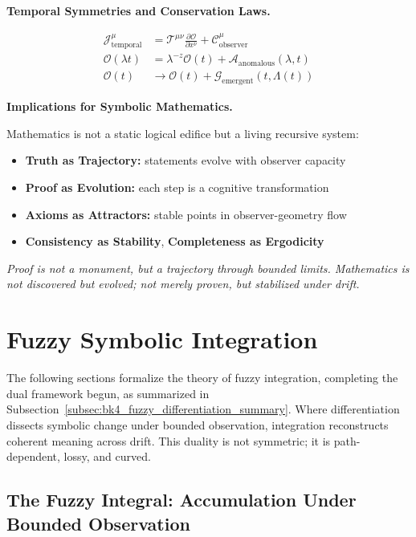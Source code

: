 \begin{scholium}
\vspace{1em}
\noindent\textbf{Temporal Symmetries and Conservation Laws.}

\begin{align*}
\mathcal{J}_{\text{temporal}}^\mu &= \mathcal{T}^{\mu\nu} \frac{\partial \mathcal{O}}{\partial x^\nu} + \mathcal{C}_{\text{observer}}^\mu \\
\mathcal{O}(\lambda t) &= \lambda^{-z} \mathcal{O}(t) + \mathcal{A}_{\text{anomalous}}(\lambda, t) \\
\mathcal{O}(t) &\rightarrow \mathcal{O}(t) + \mathcal{G}_{\text{emergent}}(t, \Lambda(t))
\end{align*}

\vspace{1em}
\noindent\textbf{Implications for Symbolic Mathematics.}

Mathematics is not a static logical edifice but a living recursive system:
\begin{itemize}
    \item \textbf{Truth as Trajectory:} statements evolve with observer capacity
    \item \textbf{Proof as Evolution:} each step is a cognitive transformation
    \item \textbf{Axioms as Attractors:} stable points in observer-geometry flow
    \item \textbf{Consistency as Stability}, \textbf{Completeness as Ergodicity}
\end{itemize}

\textit{Proof is not a monument, but a trajectory through bounded limits. Mathematics is not discovered but evolved; not merely proven, but stabilized under drift.}

\end{scholium}

\section{Fuzzy Symbolic Integration}
\label{sec:bk4_fuzzy_symbolic_integration}

The following sections formalize the theory of fuzzy integration, completing the dual framework begun, as summarized in Subsection~\ref{subsec:bk4_fuzzy_differentiation_summary}. Where differentiation dissects symbolic change under bounded observation, integration reconstructs coherent meaning across drift. This duality is not symmetric; it is path-dependent, lossy, and curved.

\subsection{The Fuzzy Integral: Accumulation Under Bounded Observation}
\label{subsec:bk4_fuzzy_integral_operator}

